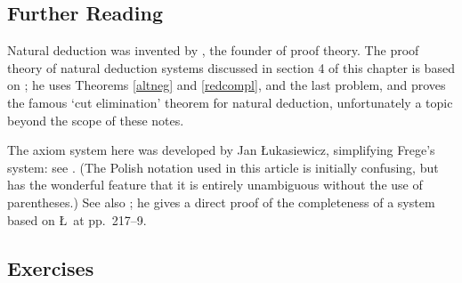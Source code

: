 {\small
\subsection*{Further Reading}

Natural deduction was invented  by \citet{geninvinl}, the founder of proof theory. 
The proof theory of natural deduction systems discussed in section 4 of this chapter is based on \citet[39--41]{pranatde}; he uses Theorems \ref{altneg} and \ref{redcompl}, and the last problem, and proves the famous `cut elimination' theorem for natural deduction, unfortunately a topic beyond the scope of these notes.



 The axiom system here was developed by Jan \L ukasiewicz, simplifying Frege's system: see \citet[p. 25]{boslogwol}. (The Polish notation used in this article is initially confusing, but has the wonderful feature that it is entirely unambiguous without the use of parentheses.)
See also \citet[ch. 5--6]{bosintlo}; he gives a direct proof of the completeness of a system based on \L\ at pp.\ 217--9.


\subsection*{Exercises}


}
